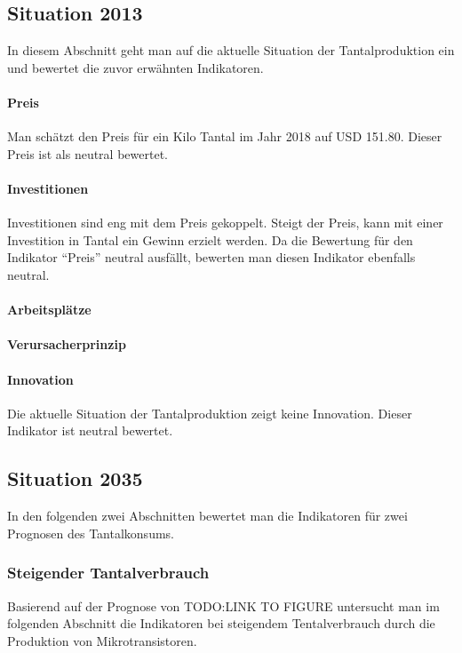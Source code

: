\subsection{Situation 2013}
In diesem Abschnitt geht man auf die aktuelle Situation der Tantalproduktion ein
und bewertet die zuvor erwähnten Indikatoren.

\paragraph{Preis}
Man schätzt den Preis für ein Kilo Tantal im Jahr 2018 auf USD
151.80.\cite{tantal_price} Dieser Preis ist als neutral bewertet.

\paragraph{Investitionen}
Investitionen sind eng mit dem Preis gekoppelt. Steigt der Preis, kann mit einer
Investition in Tantal ein Gewinn erzielt werden. Da die Bewertung für den
Indikator ``Preis'' neutral ausfällt, bewerten man diesen Indikator ebenfalls
neutral.

\paragraph{Arbeitsplätze}

\paragraph{Verursacherprinzip}

\paragraph{Innovation}
Die aktuelle Situation der Tantalproduktion zeigt keine Innovation. Dieser
Indikator ist neutral bewertet.

\subsection{Situation 2035}
In den folgenden zwei Abschnitten bewertet man die Indikatoren für zwei
Prognosen des Tantalkonsums.

\subsubsection{Steigender Tantalverbrauch}
Basierend auf der Prognose von TODO:LINK TO FIGURE untersucht man im folgenden
Abschnitt die Indikatoren bei steigendem Tentalverbrauch durch die Produktion
von Mikrotransistoren.

